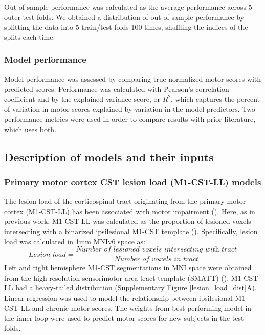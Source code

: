 \documentclass[phd,tocprelim]{cornell}
\begin{document}
Out-of-sample performance was calculated as the average performance across 5 outer test folds. We obtained a distribution of out-of-sample performance by splitting the data into 5 train/test folds 100 times, shuffling the indices of the splits each time. 

\subsubsection*{Model performance}
Model performance was assessed by comparing true normalized motor scores with predicted scores. Performance was calculated with Pearson's correlation coefficient and by the explained variance score, or $R^2$, which captures the percent of variation in motor scores explained by variation in the model predictors. Two performance metrics were used in order to compare results with prior literature, which uses both.

\subsection{Description of models and their inputs}
\subsubsection*{Primary motor cortex CST lesion load (M1-CST-LL) models}

The lesion load of the corticospinal tract originating from the primary motor cortex (M1-CST-LL) has been associated with motor impairment (\cite{Stinear2017-eg}). Here, as in previous work, M1-CST-LL was calculated as the proportion of lesioned voxels intersecting with a binarized ipsilesional M1-CST template (\cite{Zhu2010-qh}). Specifically, lesion load was calculated in 1mm MNIv6 space as:
\begin{equation}
    \textit{Lesion load} = \frac{\textit{Number of lesioned voxels intersecting with  tract}}{\textit{Number of voxels in tract}}
\end{equation}
Left and right hemisphere M1-CST segmentations in MNI space were obtained from the high-resolution sensorimotor area tract template (SMATT) (\cite{Archer2018-ti}). M1-CST-LL had a heavy-tailed distribution (Supplementary Figure \ref{lesion_load_dist}A).
Linear regression was used to model the relationship between ipsilesional M1-CST-LL and chronic motor scores. The weights from best-performing model in the inner loop were used to predict motor scores for new subjects in the test folds. 
\end{document}
